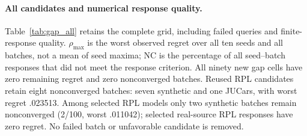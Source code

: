\paragraph{All candidates and numerical response quality.}
Table~\ref{tab:gap_all} retains the complete grid, including failed queries
and finite-response quality. $\rho_{\max}$ is the worst observed regret over
all ten seeds and all batches, not a mean of seed maxima; NC is the percentage
of all seed--batch responses that did not meet the response criterion.
All ninety new gap cells have zero remaining regret and zero nonconverged
batches. Reused RPL candidates retain eight nonconverged batches: seven
synthetic and one JUCars, with worst regret .023513. Among selected RPL
models only two synthetic batches remain nonconverged (2/100, worst .011042);
selected real-source RPL responses have zero regret. No failed batch or
unfavorable candidate is removed.
